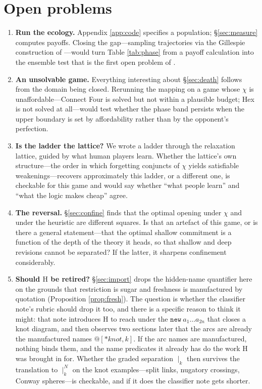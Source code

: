 \documentclass[11pt]{article}
\theoremstyle{definition}
\theoremstyle{plain}
\theoremstyle{remark}
\newcommand{\Hq}{\mathrm{H}}
\begin{document}
\section{Open problems}

\begin{enumerate}
\item \textbf{Run the ecology.} Appendix \ref{app:code} specifies a population;
\S\ref{sec:measure} computes payoffs. Closing the gap---sampling trajectories
via the Gillespie construction of \cite{stochastic}---would turn Table
\ref{tab:phase} from a payoff calculation into the ensemble test that is the
first open problem of \cite{scientist}.

\item \textbf{An unsolvable game.} Everything interesting about
\S\ref{sec:death} follows from the domain being closed. Rerunning the mapping on
a game whose $\chi$ is unaffordable---Connect Four is solved but not within a
plausible budget; Hex is not solved at all---would test whether the phase band
persists when the upper boundary is set by affordability rather than by the
opponent's perfection.

\item \textbf{Is the ladder the lattice?} We wrote a ladder through the
relaxation lattice, guided by what human players learn. Whether the lattice's own
structure---the order in which forgetting conjuncts of $\chi$ yields satisfiable
weakenings---recovers approximately this ladder, or a different one, is
checkable for this game and would say whether ``what people learn'' and ``what
the logic makes cheap'' agree.

\item \textbf{The reversal.} \S\ref{sec:confine} finds that the optimal opening
under $\chi$ and under the heuristic are different squares. Is that an artefact
of this game, or is there a general statement---that the optimal shallow
commitment is a function of the depth of the theory it heads, so that shallow
and deep revisions cannot be separated? If the latter, it sharpens confinement
considerably.

\item \textbf{Should $\Hq$ be retired?} \S\ref{sec:import} drops the hidden-name
quantifier here on the grounds that restriction is sugar and freshness is
manufactured by quotation (Proposition \ref{prop:fresh}). The question is
whether the classifier note's rubric should drop it too, and there is a specific
reason to think it might: that note introduces $\Hq$ to reach under the
$\texttt{new}\ a_1 \dots a_{2n}$ that closes a knot diagram, and then observes
two sections later that the arcs are already the manufactured names
$@[*\mathit{knot},k]$. If the arc names are manufactured, nothing binds them,
and the name predicates it already has do the work $\Hq$ was brought in for.
Whether the graded separation $\mid_k$ then survives the translation to
$\mid_k^N$ on the knot examples---split links, nugatory crossings, Conway
spheres---is checkable, and if it does the classifier note gets shorter.


\end{enumerate}
\end{document}
